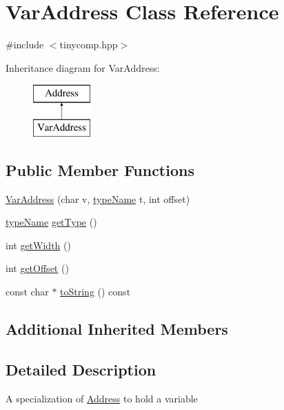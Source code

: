 \hypertarget{class_var_address}{}\section{Var\+Address Class Reference}
\label{class_var_address}


{\ttfamily \#include $<$tinycomp.\+hpp$>$}

Inheritance diagram for Var\+Address\+:\begin{figure}[H]
\begin{center}
\leavevmode
\includegraphics[height=2.000000cm]{class_var_address}
\end{center}
\end{figure}
\subsection*{Public Member Functions}
\begin{DoxyCompactItemize}
\item 
\hyperlink{class_var_address_ac99b3b4bc40e6dc1a4f0dede68d858cf}{Var\+Address} (char v, \hyperlink{tinycomp_8h_aca554671f4620139c1393f96d2af74bc}{type\+Name} t, int offset)
\item 
\hyperlink{tinycomp_8h_aca554671f4620139c1393f96d2af74bc}{type\+Name} \hyperlink{class_var_address_a01ec05b9f9e33978980d6ad676154a91}{get\+Type} ()
\item 
int \hyperlink{class_var_address_aa3b8cd6699634ac705fc2dea982e0b87}{get\+Width} ()
\item 
int \hyperlink{class_var_address_a825ed81c1a17b3d374999f0457a35a48}{get\+Offset} ()
\item 
const char $\ast$ \hyperlink{class_var_address_abadfe890b239f9dcc5ae5bbe31626d49}{to\+String} () const 
\end{DoxyCompactItemize}
\subsection*{Additional Inherited Members}


\subsection{Detailed Description}
A specialization of \hyperlink{class_address}{Address} to hold a variable 

